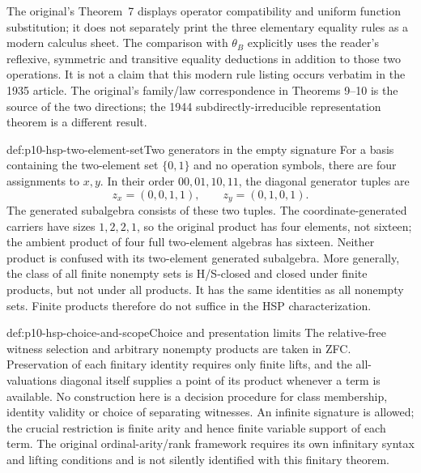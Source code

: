 The original's Theorem~7 displays operator compatibility and
uniform function substitution; it does not separately print the
three elementary equality rules as a modern calculus sheet.
The comparison with \(\theta_B\) explicitly uses the reader's
reflexive, symmetric and transitive equality deductions in addition
to those two operations. It is not a claim that this modern rule
listing occurs verbatim in the 1935 article.
The original's family/law correspondence in Theorems 9--10 is the
source of the two directions; the 1944 subdirectly-irreducible
representation theorem is a different result.

\begin{hbexample}{def:p10-hsp-two-element-set}{Two generators in the empty signature}
For a basis containing the two-element set \(\{0,1\}\) and no
operation symbols, there are four assignments to \(x,y\).
In their order \(00,01,10,11\), the diagonal generator tuples are
\[
 z_x=(0,0,1,1),\qquad z_y=(0,1,0,1).
\]
The generated subalgebra consists of these two tuples.
The coordinate-generated carriers have sizes \(1,2,2,1\),
so the original product has four elements, not sixteen;
the ambient product of four full two-element algebras has sixteen.
Neither product is confused with its two-element generated subalgebra.
More generally, the class of all finite nonempty sets is H/S-closed
and closed under finite products, but not under all products.
It has the same identities as all nonempty sets. Finite products
therefore do not suffice in the HSP characterization.
\end{hbexample}

\begin{proofboundary}{def:p10-hsp-choice-and-scope}{Choice and presentation limits}
The relative-free witness selection and arbitrary nonempty products
are taken in ZFC. Preservation of each finitary identity requires
only finite lifts, and the all-valuations diagonal itself supplies
a point of its product whenever a term is available.
No construction here is a decision procedure for class membership,
identity validity or choice of separating witnesses.
An infinite signature is allowed; the crucial restriction is
finite arity and hence finite variable support of each term.
The original ordinal-arity/rank framework requires its own
infinitary syntax and lifting conditions and is not silently
identified with this finitary theorem.
\end{proofboundary}
